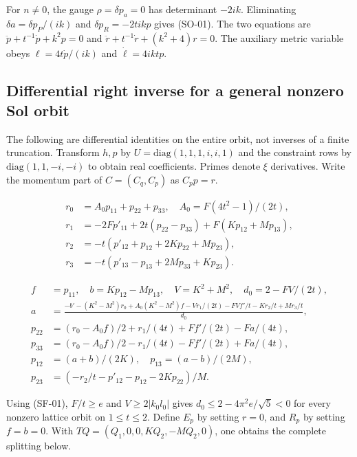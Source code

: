 For $n\ne0$, the gauge $\rho=\delta p_a=0$ has determinant $-2ik$. Eliminating $\delta a=\delta p_P/(ik)$ and $\delta p_R=-2tikp$ gives (SO-01). The two equations are $\ddot p+t^{-1}\dot p+k^2p=0$ and $\ddot r+t^{-1}\dot r+(k^2+4)r=0$. The auxiliary metric variable obeys $\ell=4t\dot p/(ik)$ and $\dot\ell=4iktp$.

\subsection{Differential right inverse for a general nonzero Sol orbit}

The following are differential identities on the entire orbit, not inverses of a finite truncation. Transform $h,p$ by $U=\mathrm{diag}(1,1,1,i,i,1)$ and the constraint rows by $\mathrm{diag}(1,1,-i,-i)$ to obtain real coefficients. Primes denote $\xi$ derivatives. Write the momentum part of $C=(C_q,C_p)$ as $C_pp=r$.

\begin{equation}\tag{SG-02}\label{eq:SG-02}
\begin{aligned}
r_0&=A_0p_{11}+p_{22}+p_{33},\quad A_0=F(4t^2-1)/(2t),\\
r_1&=-2Fp'_{11}+2t(p_{22}-p_{33})+F(Kp_{12}+Mp_{13}),\\
r_2&=-t(p'_{12}+p_{12}+2Kp_{22}+Mp_{23}),\\
r_3&=-t(p'_{13}-p_{13}+2Mp_{33}+Kp_{23}).
\end{aligned}
\end{equation}

\begin{equation}\tag{SG-03}\label{eq:SG-03}
\begin{aligned}
f&=p_{11},\quad b=Kp_{12}-Mp_{13},\quad V=K^2+M^2,\quad d_0=2-FV/(2t),\\
a&=\frac{-b'-(K^2-M^2)r_0+A_0(K^2-M^2)f-Vr_1/(2t)-FVf'/t-Kr_2/t+Mr_3/t}{d_0},\\
p_{22}&=(r_0-A_0f)/2+r_1/(4t)+Ff'/(2t)-Fa/(4t),\\
p_{33}&=(r_0-A_0f)/2-r_1/(4t)-Ff'/(2t)+Fa/(4t),\\
p_{12}&=(a+b)/(2K),\quad p_{13}=(a-b)/(2M),\\
p_{23}&=(-r_2/t-p'_{12}-p_{12}-2Kp_{22})/M.
\end{aligned}
\end{equation}

Using (SF-01), $F/t\ge e$ and $V\ge2|k_0l_0|$ gives $d_0\le2-4\pi^2e/\sqrt5<0$ for every nonzero lattice orbit on $1\le t\le2$. Define $E_p$ by setting $r=0$, and $R_p$ by setting $f=b=0$. With $TQ=(Q_1,0,0,KQ_2,-MQ_2,0)$, one obtains the complete splitting below.

